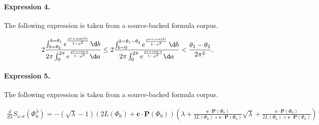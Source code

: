 \documentclass[11pt]{article}
\begin{document}
\paragraph{Expression 4.} The following expression is taken from a source-backed formula corpus.

\begin{align*}2\frac{\int_{b=\theta_{2}}^{b=\theta_{1}}e^{\frac{\rho rs\cos(b)}{1-\rho^{2}}}\,\d b}{2\pi\int_{0}^{2\pi}e^{\frac{\rho rs\cos a}{1-\rho^{2}}}\d a}\leq2\frac{\int_{b=0}^{b=\theta_{1}-\theta_{2}}e^{\frac{\rho rs\cos(b)}{1-\rho^{2}}}\,\d b}{2\pi\int_{0}^{2\pi}e^{\frac{\rho rs\cos a}{1-\rho^{2}}}\d a}<\frac{\theta_{1}-\theta_{2}}{2\pi^{2}}.\end{align*}

\paragraph{Expression 5.} The following expression is taken from a source-backed formula corpus.

\begin{align*}\frac{d}{d\lambda}S_{\omega,\mathbf{c}}(\Phi_0^{\lambda})=-(\sqrt{\lambda}-1)(2L(\Phi_0)+\mathbf{c}\cdot \mathbf{P}(\Phi_0))\left(\lambda +\frac{\mathbf{c}\cdot \mathbf{P}(\Phi_0)}{2L(\Phi_0)+\mathbf{c}\cdot \mathbf{P}(\Phi_0)}\sqrt{\lambda}+\frac{\mathbf{c}\cdot \mathbf{P}(\Phi_0)}{2L(\Phi_0)+\mathbf{c}\cdot \mathbf{P}(\Phi_0)}\right)\end{align*}
\end{document}
